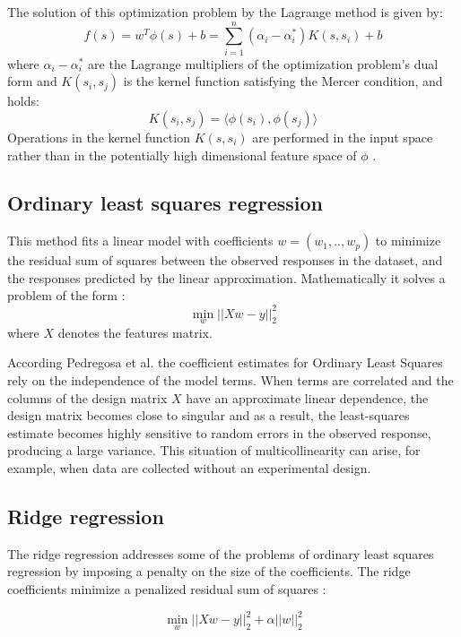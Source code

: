 The solution of this optimization problem by the Lagrange method is given by:
\begin{equation*}
f(s) = w^T \phi (s) + b = \sum_{i=1}^{n} (\alpha_i - \alpha_i^*) K (s,s_i) + b
\end{equation*}
where $\alpha_i - \alpha_i^*$ are the Lagrange multipliers of the
optimization problem’s dual form and $K(s_i,s_j )$ is the kernel
function satisfying the Mercer condition, and holds:
\begin{equation*}
K(s_i,s_j ) = \big \langle  \phi(s_i) , \phi(s_j)  \big \rangle
\end{equation*}
Operations in the kernel function $K(s,s_i )$ are performed in the
input space rather than in the potentially high dimensional feature
space of $\phi$ \citep{Alonso2013}.

\subsection{Ordinary least squares regression}

This method fits a linear model with coefficients $w = (w_1,..,w_p)$
to minimize the residual sum of squares between the observed responses
in the dataset, and the responses predicted by the linear
approximation. Mathematically it solves a problem of the form
\citep{scikitlearn2011}:
$$\min_{w} \Bigr| \Bigr| Xw - y \Bigr| \Bigr|_2^2  $$
where $X$ denotes the features matrix.

According Pedregosa et al. \citep{scikitlearn2011}  the coefficient estimates for Ordinary Least Squares rely on the independence of the model terms. When terms are correlated and the columns of the design matrix $X$ have an approximate linear dependence, the design matrix becomes close to singular and as a result, the least-squares estimate becomes highly sensitive to random errors in the observed response, producing a large variance. This situation of multicollinearity can arise, for example, when data are collected without an experimental design.

\subsection{Ridge regression}
The ridge regression addresses some of the problems of ordinary least squares regression by imposing a penalty on the size of the coefficients. The ridge coefficients minimize a penalized residual sum of squares  \citep{scikitlearn2011}:

$$\min_{w} { \Bigr| \Bigr| Xw - y \Bigr| \Bigr|_2^2  + \alpha \Bigr| \Bigr| w \Bigr| \Bigr|_2^2 } $$

